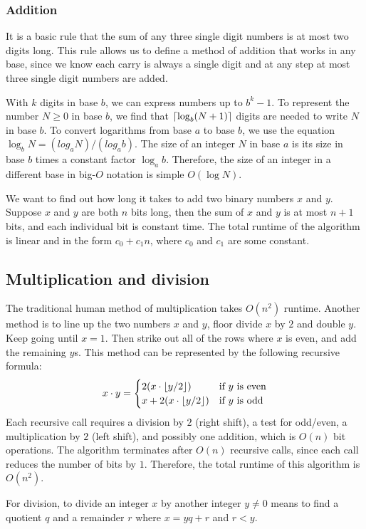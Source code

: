 \subsubsection{Addition}
It is a basic rule that the sum of any three single digit numbers is at most two digits long.
This rule allows us to define a method of addition that works in any base, since we know each carry is always a single digit and at any step at most three single digit numbers are added. \par
With $k$ digits in base $b$, we can express numbers up to $b^k - 1$.
To represent the number $N \geq 0$ in base $b$, we find that $\left\lceil{\log_b(N+1)}\right\rceil$ digits are needed to write $N$ in base $b$.
To convert logarithms from base $a$ to base $b$, we use the equation $\log_b N = (log_a N)/(log_a b)$.
The size of an integer $N$ in base $a$ is its size in base $b$ times a constant factor $\log_a b$.
Therefore, the size of an integer in a different base in big-$O$ notation is simple $O(\log N)$. \par
We want to find out how long it takes to add two binary numbers $x$ and $y$.
Suppose $x$ and $y$ are both $n$ bits long, then the sum of $x$ and $y$ is at most $n + 1$ bits, and each individual bit is constant time.
The total runtime of the algorithm is linear and in the form $c_0 + c_1 n$, where $c_0$ and $c_1$ are some constant.

\subsection{Multiplication and division}
The traditional human method of multiplication takes $O(n^2)$ runtime.
Another method is to line up the two numbers $x$ and $y$, floor divide $x$ by $2$ and double $y$.
Keep going until $x = 1$.
Then strike out all of the rows where $x$ is even, and add the remaining $y$s.
This method can be represented by the following recursive formula:
\[x \cdot y = \begin{cases}
  2(x \cdot \left\lfloor{y / 2}\right\rfloor) & \text{if $y$ is even} \\
  x + 2(x \cdot \left\lfloor{y / 2}\right\rfloor) & \text{if $y$ is odd} \\
\end{cases}\]
Each recursive call requires a division by $2$ (right shift), a test for odd/even, a multiplication by $2$ (left shift), and possibly one addition, which is $O(n)$ bit operations.
The algorithm terminates after $O(n)$ recursive calls, since each call reduces the number of bits by $1$.
Therefore, the total runtime of this algorithm is $O(n^2)$.\par
For division, to divide an integer $x$ by another integer $y \neq 0$ means to find a quotient $q$ and a remainder $r$ where $x = yq + r$ and $r < y$.

